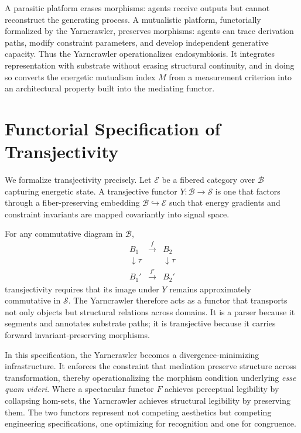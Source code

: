 \documentclass[11pt]{article}
\begin{document}
A parasitic platform erases morphisms: agents receive outputs but cannot reconstruct the generating process. A mutualistic platform, functorially formalized by the Yarncrawler, preserves morphisms: agents can trace derivation paths, modify constraint parameters, and develop independent generative capacity. Thus the Yarncrawler operationalizes endosymbiosis. It integrates representation with substrate without erasing structural continuity, and in doing so converts the energetic mutualism index $M$ from a measurement criterion into an architectural property built into the mediating functor.

\section{Functorial Specification of Transjectivity}

We formalize transjectivity precisely. Let $\mathcal{E}$ be a fibered category over $\mathcal{B}$ capturing energetic state. A transjective functor $Y : \mathcal{B} \to \mathcal{S}$ is one that factors through a fiber-preserving embedding $\mathcal{B} \hookrightarrow \mathcal{E}$ such that energy gradients and constraint invariants are mapped covariantly into signal space.

For any commutative diagram in $\mathcal{B}$,
\[
\begin{array}{ccc}
B_1 & \xrightarrow{f} & B_2 \\[4pt]
\downarrow{\scriptstyle\tau} & & \downarrow{\scriptstyle\tau} \\[4pt]
B_1' & \xrightarrow{f'} & B_2'
\end{array}
\]
transjectivity requires that its image under $Y$ remains approximately commutative in $\mathcal{S}$. The Yarncrawler therefore acts as a functor that transports not only objects but structural relations across domains. It is a parser because it segments and annotates substrate paths; it is transjective because it carries forward invariant-preserving morphisms.

In this specification, the Yarncrawler becomes a divergence-minimizing infrastructure. It enforces the constraint that mediation preserve structure across transformation, thereby operationalizing the morphism condition underlying \textit{esse quam videri}. Where a spectacular functor $F$ achieves perceptual legibility by collapsing hom-sets, the Yarncrawler achieves structural legibility by preserving them. The two functors represent not competing aesthetics but competing engineering specifications, one optimizing for recognition and one for congruence.
\end{document}
